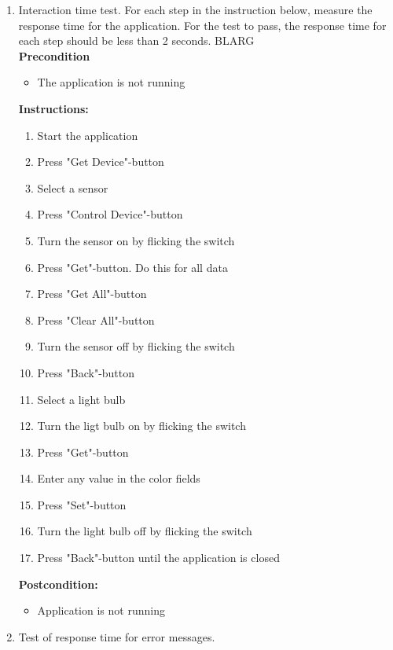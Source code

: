 \documentclass[a4paper]{article}
\newlength{\testlabellength}
\newenvironment{testlist}{\begin{enumerate}[label=\bfseries Instruction \thesubsection.\arabic* , labelindent=0pt, labelwidth=\testlabellength , leftmargin=2cm]}{\end{enumerate}}
\newenvironment{precondition}{
{\color{white}BLARG}\\ 
\textbf{Precondition}
\begin{itemize}[labelindent=0cm, labelwidth=2cm , leftmargin=1cm]
}
{\end{itemize}}
\newenvironment{instruction}{
\textbf{Instructions:}
\begin{enumerate}[label=\bfseries  \arabic*., labelindent=0cm, labelwidth=2cm , leftmargin=1cm]
}
{\end{enumerate}}
\newenvironment{postcondition}{
\textbf{Postcondition:}
\begin{itemize}[labelindent=0cm, labelwidth=2cm , leftmargin=1cm]
}
{\end{itemize}}
\begin{document}
\begin{appendices}
\begin{testlist}
\newpage
	\item Interaction time test. \newline
		For each step in the instruction below, measure the response time for the application. For the test to pass, the response time for each step should be less than 2 seconds.
		\begin{precondition}
			\item The application is not running
		\end{precondition}
		\begin{instruction}
			\item Start the application
            \item Press "Get Device"-button
            \item Select a sensor
            \item Press "Control Device"-button
            \item Turn the sensor on by flicking the switch
            \item Press "Get"-button. Do this for all data
            \item Press "Get All"-button
            \item Press "Clear All"-button
            \item Turn the sensor off by flicking the switch
            \item Press "Back"-button
            \item Select a light bulb
            \item Turn the ligt bulb on by flicking the switch
            \item Press "Get"-button
            \item Enter any value in the color fields
            \item Press "Set"-button
            \item Turn the light bulb off by flicking the switch
            \item Press "Back"-button until the application is closed
		\end{instruction}
		\begin{postcondition}
			\item Application is not running
		\end{postcondition}
\newpage
	\item Test of response time for error messages.\newline

\end{testlist}
\end{appendices}
\end{document}
